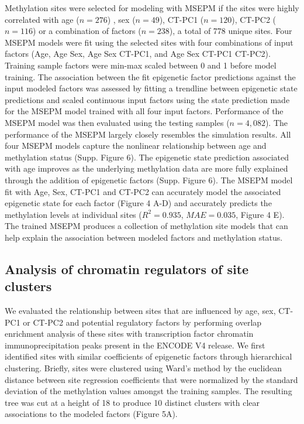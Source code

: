 \documentclass{article}
\begin{document}
{\begin{linenumbers}
Methylation sites were selected for modeling with MSEPM if the sites were highly correlated with 
age ($n=276$) , sex ($n=49$), CT-PC1 ($n=120$), CT-PC2 ($n=116$) or a combination of factors ($n=238$), 
a total of 778 unique sites. Four MSEPM models were fit using the selected sites with four combinations of input 
factors (Age, Age Sex, Age Sex CT-PC1, and Age Sex CT-PC1 CT-PC2). Training sample factors were min-max scaled between 
0 and 1 before model training. The association between the fit epigenetic factor predictions against the input modeled 
factors was assessed by fitting a trendline between epigenetic state predictions and scaled continuous input factors 
using the state prediction made for the MSEPM model trained with all four input factors. Performance of the MSEPM 
model was then evaluated using the testing samples ($n=4,082$). The performance of the MSEPM largely closely 
resembles the simulation results. All four MSEPM models capture the nonlinear relationship between age and 
methylation status (Supp. Figure 6). The epigenetic state prediction associated with age improves as the underlying 
methylation data are more fully explained through the addition of epigenetic factors (Supp. Figure 6). The MSEPM model 
fit with Age, Sex, CT-PC1 and CT-PC2 can accurately model the associated epigenetic state for each factor (Figure 4 A-D) 
and accurately predicts the methylation levels at individual sites ($R^2=0.935$, $MAE=0.035$, Figure 4 E). 
The trained MSEPM produces a collection of methylation site models that can help explain the association between 
modeled factors and methylation status. 

\subsection{Analysis of chromatin regulators of site clusters}

We evaluated the relationship between sites that are influenced by age, sex, CT-PC1 or CT-PC2  and potential 
regulatory factors by performing overlap enrichment analysis of these sites with transcription factor chromatin 
immunoprecipitation peaks present in the ENCODE V4 \cite{ENCODE_Project_Consortium2012-oe,Davis2018-ha} release. We 
first identified sites with similar coefficients of epigenetic factors through hierarchical clustering. Briefly, 
sites were clustered using Ward's method by the euclidean distance between site regression coefficients that were 
normalized by the standard deviation of the methylation values amongst the training samples. The resulting tree was 
cut at a height of 18 to produce 10 distinct clusters with clear associations to the modeled factors (Figure 5A). 


\end{linenumbers}}
\end{document}
